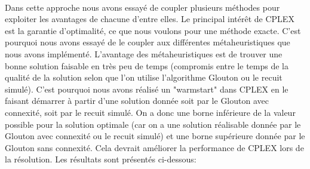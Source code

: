 \documentclass[a4paper, 11pt]{article} %
\begin{document}
\paragraph*{}
Dans cette approche nous avons essayé de coupler plusieurs méthodes pour exploiter les avantages de chacune d'entre elles. Le principal intérêt de CPLEX est la garantie d'optimalité, ce que nous voulons pour une méthode exacte. C'est pourquoi nous avons essayé de le coupler aux différentes métaheuristiques que nous avons implémenté. L'avantage des métaheuristiques est de trouver une bonne solution faisable en très peu de temps (compromis entre le temps de la qualité de la solution selon que l'on utilise l'algorithme Glouton ou le recuit simulé). C'est pourquoi nous avons réalisé un "warmstart" dans CPLEX en le faisant démarrer à partir d'une solution donnée soit par le Glouton avec connexité, soit par le recuit simulé. On a donc une borne inférieure de la valeur possible pour la solution optimale (car on a une solution réalisable donnée par le Glouton avec connexité ou le recuit simulé) et une borne supérieure donnée par le Glouton sans connexité. Cela devrait améliorer la performance de CPLEX lors de la résolution. Les résultats sont présentés ci-dessous:
\end{document}
